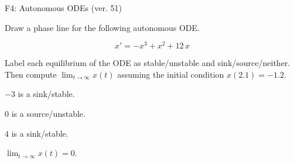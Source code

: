 \begin{exercise}
  \begin{exerciseTitle}F4: Autonomous ODEs (ver. 51)\end{exerciseTitle}
  \begin{exerciseStatement}
    

      Draw a phase line for the following 
      autonomous ODE.
    

    
\[x'= -x^{3} + x^{2} + 12 \, x\]

    

      Label each equilibrium of the ODE
      as stable/unstable and sink/source/neither.
      Then compute \(\lim_{t\to\infty}x(t)\)
      assuming the initial condition
      \(x( 2.1 )= -1.2\).
    

  \end{exerciseStatement}
  \begin{exerciseAnswer}
    

      \(-3\) is a sink/stable.
      
        \(0\) is a source/unstable.
      
      \(4\) is a sink/stable.
    

    

      \(\lim_{t\to\infty}x(t)=0\).
    

  \end{exerciseAnswer}
\end{exercise}